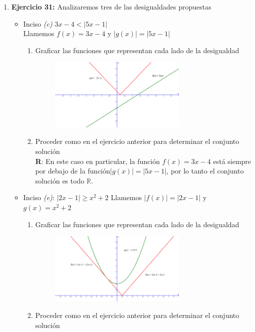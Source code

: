 \documentclass[12pt]{article}
\theoremstyle{definition}
\begin{document}
\begin{enumerate}
\item  \textbf{Ejercicio 31:} Analizaremos tres de las desigualdades propuestas
\begin{itemize}
\item  Inciso \textit{(c)} $3x-4 <|5x-1| $\\
Llamemos $f(x) = 3x-4 $ y $|g(x)| = |5x-1| $
	\begin{enumerate}
	\item Graficar las funciones que representan cada lado de la desigualdad
	\begin{figure}[H]
	\centering
	\includegraphics[width=0.7\textwidth]{31-1.png}
	\end{figure}
	\item Proceder como en el ejercicio anterior para determinar el conjunto solución\\
	\textbf{R}: En este caso en particular, la función $f(x) =3x-4$ está siempre por debajo de la función$ |g(x)| =|5x-1| $, por lo tanto el conjunto solución es todo $\mathbb{R}$.
	\end{enumerate}
\item Inciso \textit{(e)}: $ |2x-1|\geq x^{2}+2 $
	Llamemos $|f(x)| =  |2x-1| $ y $g(x) = x^{2}+2 $
	\begin{enumerate}
	\item Graficar las funciones que representan cada lado de la desigualdad
	\begin{figure}[H]
	\centering
	\includegraphics[width=0.7\textwidth]{31-2.png}
	\end{figure}
	\item Proceder como en el ejercicio anterior para determinar el conjunto solución\\

\end{enumerate}
\end{itemize}
\end{enumerate}
\end{document}
